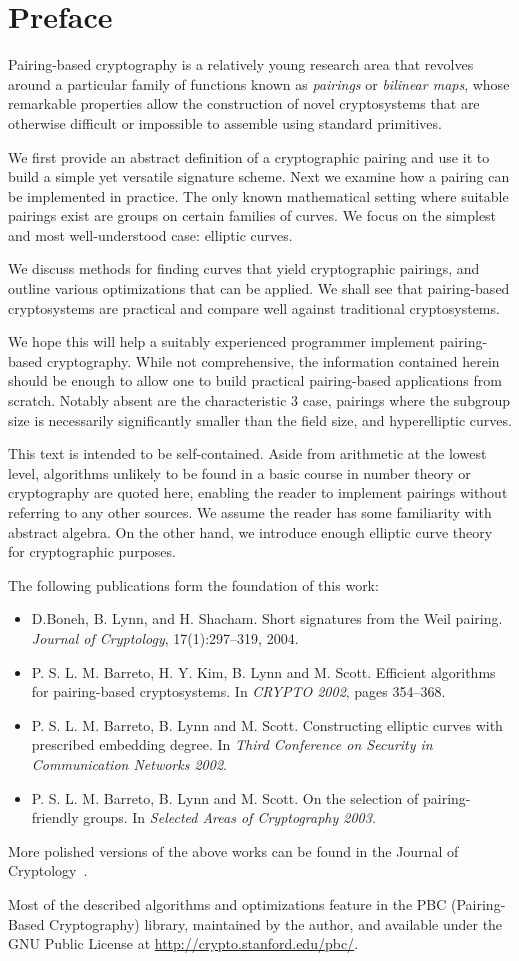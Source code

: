 \chapter*{Preface}
Pairing-based cryptography is a relatively young research area that
revolves around a particular family of functions known as \emph{pairings} or
\emph{bilinear maps}, whose remarkable properties allow the construction of
novel cryptosystems that are otherwise difficult or impossible to assemble
using standard primitives.

We first provide an abstract definition of a cryptographic pairing and use it
to build a simple yet versatile signature scheme. Next we examine how a pairing
can be implemented in practice. The only known mathematical setting where
suitable pairings exist are groups on certain families of curves. We focus on
the simplest and most well-understood case: elliptic curves.

We discuss methods for finding curves that yield cryptographic pairings, and
outline various optimizations that can be applied. We shall see that
pairing-based cryptosystems are practical and compare well against traditional
cryptosystems.

We hope this will help a suitably experienced programmer implement
pairing-based cryptography. While not comprehensive, the information contained
herein should be enough to allow one to build practical pairing-based
applications from scratch. Notably absent are the characteristic 3 case,
pairings where the subgroup size is necessarily significantly smaller than the
field size, and hyperelliptic curves.

This text is intended to be self-contained. Aside from arithmetic at the lowest
level, algorithms unlikely to be found in a basic course in number theory or
cryptography are quoted here, enabling the reader to implement pairings without
referring to any other sources. We assume the reader has some familiarity with
abstract algebra. On the other hand, we introduce enough elliptic curve theory
for cryptographic purposes.

The following publications form the foundation of this work:
\begin{itemize}
\item D.Boneh, B. Lynn, and H. Shacham. Short signatures from the Weil pairing.
{\it Journal of Cryptology}, 17(1):297--319, 2004.
\item
P. S. L. M. Barreto, H. Y. Kim, B. Lynn and M. Scott.
Efficient algorithms for pairing-based cryptosystems. In {\it CRYPTO 2002},
pages 354--368.
\item P. S. L. M. Barreto, B. Lynn and M. Scott.
Constructing elliptic curves with prescribed embedding degree. In {\it Third
Conference on Security in Communication Networks 2002}.
\item P. S. L. M. Barreto, B. Lynn and M. Scott.
On the selection of pairing-friendly groups. In {\it Selected Areas of Cryptography 2003}.
\end{itemize}
More polished versions of the above works can be found
in the Journal of Cryptology~\cite{blsjournal, balsjournal}.

Most of the described algorithms and optimizations feature in the PBC
(Pairing-Based Cryptography) library, maintained by the author, and available
under the GNU Public License at \url{http://crypto.stanford.edu/pbc/}.
